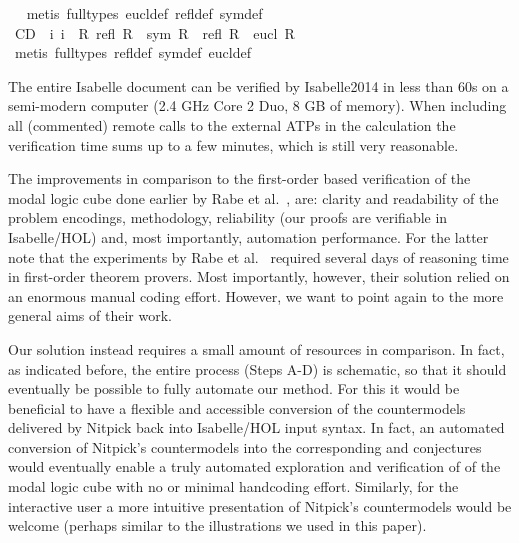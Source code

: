 \begin{isabellebody}
%
\isadelimproof
\ %
\endisadelimproof
%
\isatagproof
{}\isamarkupfalse%
\ {\isacharparenleft}metis\ {\isacharparenleft}full{\isacharunderscore}types{\isacharparenright}\ eucl{\isacharunderscore}def\ refl{\isacharunderscore}def\ sym{\isacharunderscore}def{\isacharparenright}%
\endisatagproof
{\isafoldproof}%
%
\isadelimproof
\isanewline
%
\endisadelimproof
{}\isamarkupfalse%
\ C{}{}{\isacharunderscore}D{\isacharcolon}\ {\isachardoublequoteopen}{\isacharhash}\ i{}\ i{}\ {\isasymlongrightarrow}\ {\isacharparenleft}{\isasymforall}R{\isachardot}\ {\isacharparenleft}refl\ R\ {\isasymand}\ sym\ R{\isacharparenright}\ {\isasymlongrightarrow}\ {\isacharparenleft}refl\ R\ {\isasymand}\ eucl\ R{\isacharparenright}{\isacharparenright}{\isachardoublequoteclose}\isanewline
%
\isadelimproof
\ %
\endisadelimproof
%
\isatagproof
{}\isamarkupfalse%
\ {\isacharparenleft}metis\ {\isacharparenleft}full{\isacharunderscore}types{\isacharparenright}\ refl{\isacharunderscore}def\ sym{\isacharunderscore}def\ eucl{\isacharunderscore}def{\isacharparenright}%
\endisatagproof
{\isafoldproof}%
%
\isadelimproof
%
\endisadelimproof
%
\isamarkuptrue%
%
\begin{isamarkuptext}%
The entire Isabelle document can be verified by Isabelle2014 in less than 60s on a semi-modern computer (2.4 GHz Core 2 Duo, 8 GB of memory).
When including all (commented) remote calls to the external ATPs in the calculation the verification time sums up to a few minutes,
which is still very reasonable. 

The improvements in comparison to the first-order based verification of the modal logic cube done
earlier by Rabe et al.~\cite{Rabe}, are: clarity and readability of the problem encodings, methodology,
reliability (our proofs are verifiable in Isabelle/HOL) and, most importantly, automation performance.
For the latter note that the experiments by Rabe et al.~\cite{Rabe} required several days of reasoning 
time in first-order theorem provers. Most importantly, however, their solution relied on an
enormous manual coding effort. However, we want to point again to the more general aims of their work.

Our solution instead requires a small amount of resources in comparison. In fact, as indicated before, 
the entire process (Steps A-D) is schematic, so that it should eventually be possible to fully automate our method.
For this it would be beneficial to have a flexible and accessible
conversion of the countermodels delivered by Nitpick back into Isabelle/HOL input syntax.
In fact, an automated conversion of Nitpick's countermodels into the corresponding  
and  conjectures would eventually enable a truly automated exploration and verification of 
of the modal logic cube with no or minimal handcoding effort.
Similarly, for the interactive user a 
more intuitive presentation of Nitpick's countermodels would be welcome (perhaps similar to the illustrations we used 
in this paper).



\end{isamarkuptext}
\end{isabellebody}
